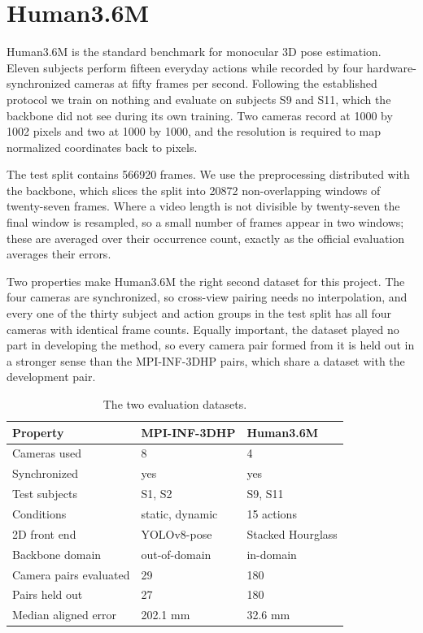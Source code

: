 \documentclass[12pt,a4paper]{report}
\begin{document}
\section{Human3.6M}

Human3.6M is the standard benchmark for monocular 3D pose estimation. Eleven subjects perform fifteen everyday actions while recorded by four hardware-synchronized cameras at fifty frames per second. Following the established protocol we train on nothing and evaluate on subjects S9 and S11, which the backbone did not see during its own training. Two cameras record at 1000 by 1002 pixels and two at 1000 by 1000, and the resolution is required to map normalized coordinates back to pixels.

The test split contains 566920 frames. We use the preprocessing distributed with the backbone, which slices the split into 20872 non-overlapping windows of twenty-seven frames. Where a video length is not divisible by twenty-seven the final window is resampled, so a small number of frames appear in two windows; these are averaged over their occurrence count, exactly as the official evaluation averages their errors.

Two properties make Human3.6M the right second dataset for this project. The four cameras are synchronized, so cross-view pairing needs no interpolation, and every one of the thirty subject and action groups in the test split has all four cameras with identical frame counts. Equally important, the dataset played no part in developing the method, so every camera pair formed from it is held out in a stronger sense than the MPI-INF-3DHP pairs, which share a dataset with the development pair.

\begin{table}[htbp]
\centering
\caption{The two evaluation datasets.}
\label{tab:datasets}
\begin{tabular}{lll}
\hline
\textbf{Property} & \textbf{MPI-INF-3DHP} & \textbf{Human3.6M} \\
\hline
Cameras used & 8 & 4 \\
Synchronized & yes & yes \\
Test subjects & S1, S2 & S9, S11 \\
Conditions & static, dynamic & 15 actions \\
2D front end & YOLOv8-pose & Stacked Hourglass \\
Backbone domain & out-of-domain & in-domain \\
Camera pairs evaluated & 29 & 180 \\
Pairs held out & 27 & 180 \\
Median aligned error & 202.1 mm & 32.6 mm \\
\hline
\end{tabular}
\end{table}
\end{document}
